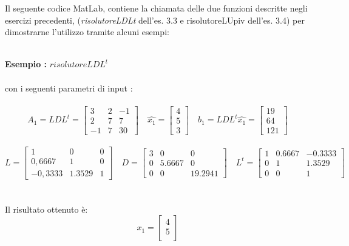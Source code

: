 Il seguente codice MatLab, contiene la chiamata delle due funzioni descritte negli esercizi precedenti, (\textit{risolutoreLDLt}  dell'es. 3.3 e risolutoreLUpiv dell'es. 3.4) per dimostrarne l'utilizzo tramite alcuni esempi:\\\
	
\begin{description}
	\item \textbf{Esempio :} \textit{$risolutoreLDL^t$}\\\\
		con i seguenti parametri di input :\\\	 
		\[
		A_1 = LDL^t =\begin{bmatrix}
			3 & 2 & -1 \\ 
			2 & 7 &  7 \\
			-1 & 7 & 30 
		\end{bmatrix} \quad
		\hat{x_1} =\begin{bmatrix}
			4 \\
			5 \\
			3                
		\end{bmatrix} \quad
		b_1 = LDL^t \hat{x_1} =\begin{bmatrix}
			19 \\
			64 \\
			121                
		\end{bmatrix}
		\]\\
		\[
		L =\begin{bmatrix}
			1 		& 0 	 & 0 \\ 
			0,6667  & 1 	 & 0 \\
	   		-0,3333 & 1.3529 & 1 
		\end{bmatrix} \quad
		D =\begin{bmatrix}
			3 & 0      & 0 	     \\ 
			0 & 5.6667 & 0       \\
			0 & 0      & 19.2941 
		\end{bmatrix} \quad
		L^t =\begin{bmatrix}
			1 & 0.6667 & -0.3333 \\ 
			0 & 1      &  1.3529 \\
			0 & 0      &  1 
		\end{bmatrix}
		\]\\\\
	Il risultato ottenuto è:\\
		\[
		x_1 =\begin{bmatrix}
			4 \\
			5 \\

\end{bmatrix}\]
\end{description}
